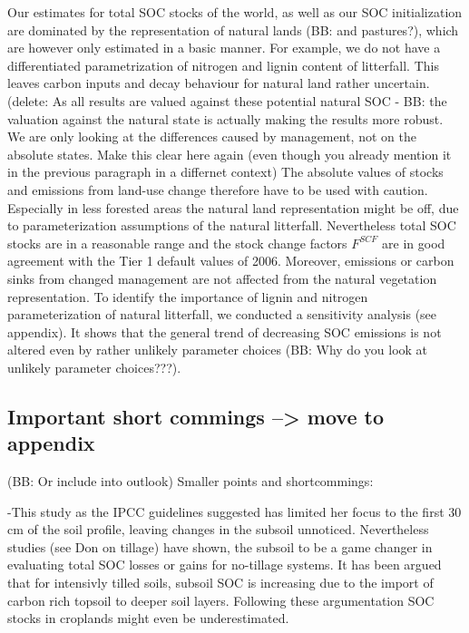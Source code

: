 \documentclass[gc, manuscript]{copernicus}
\begin{document}
Our estimates for total SOC stocks of the world, as well as our SOC initialization are dominated by the representation of natural lands (BB: and pastures?), which are however only estimated in a basic manner. For example, we do not have a differentiated parametrization of nitrogen and lignin content of litterfall.
This leaves carbon inputs and decay behaviour for natural land rather
uncertain. (delete: As all results are valued against these potential natural
SOC - BB: the valuation against the natural state is actually making the results more robust. We are only looking at the differences caused by management, not on the absolute states. Make this clear here again (even though you already mention it in the previous paragraph in a differnet context)
The absolute values of stocks and emissions from land-use change therefore have to be used
with caution. Especially in less forested areas the natural land
representation might be off, due to parameterization assumptions of the
natural litterfall. Nevertheless total SOC stocks are in a reasonable
range and the stock change factors \(F^{SCF}\) are in good agreement
with the Tier 1 default values of 2006. Moreover, emissions or carbon sinks
from changed management are not affected from the natural vegetation representation.
To identify the importance of lignin and nitrogen parameterization of natural
litterfall, we conducted a sensitivity analysis (see appendix). It shows that the general trend of decreasing
SOC emissions is not altered even by rather unlikely parameter choices (BB: Why do you look at unlikely parameter choices???).

\subsection{Important short commings --\textgreater{} move to appendix}

(BB: Or include into outlook)
Smaller points and shortcommings:

-This study as the IPCC guidelines suggested has limited her focus to
the first 30 cm of the soil profile, leaving changes in the subsoil
unnoticed. Nevertheless studies (see Don on tillage) have shown, the
subsoil to be a game changer in evaluating total SOC losses or gains for
no-tillage systems. It has been argued that for intensivly tilled soils,
subsoil SOC is increasing due to the import of carbon rich topsoil to
deeper soil layers. Following these argumentation SOC stocks in
croplands might even be underestimated.
\end{document}
